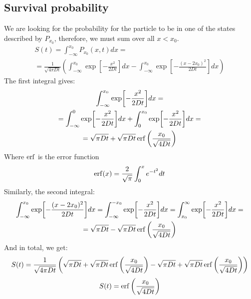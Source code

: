 \documentclass{article}
\begin{document}
\subsection{Survival probability}
We are looking for the probability for the particle to be in one of the states described by $P_{x_0}$, therefore, we must sum over all $x < x_0$.
\begin{equation}
\begin{gathered}
    S(t) = \int_{-\infty}^{x_0} P_{x_0}(x, t) dx = \\ =
    \frac{1}{\sqrt{4\pi Dt}}\left(
        \int_{-\infty}^{x_0} 
        \exp[-\frac{x^2}{2Dt}] dx - \int_{-\infty}^{x_0}\exp[-\frac{(x - 2x_0)^2}{2Dt}] dx
    \right)
\end{gathered}
\end{equation}
The first integral gives:
\begin{equation}
\begin{gathered}
    \int_{-\infty}^{x_0} \exp[-\frac{x^2}{2Dt}] dx = \\ =
    \int_{-\infty}^{0} \exp[-\frac{x^2}{2Dt}] dx +
    \int_{0}^{x_0} \exp[-\frac{x^2}{2Dt}] dx = \\ =
    \sqrt{\pi Dt} + \sqrt{\pi Dt}\erf\left(\frac{x_0}{\sqrt{4Dt}}\right)
\end{gathered}
\end{equation}
Where $\erf$ is the error function
\begin{equation}
    \erf(x) = \frac{2}{\sqrt{\pi}}\int_0^x e^{-t^2}dt
\end{equation}
Similarly, the second integral:
\begin{equation}
\begin{gathered}
    \int_{-\infty}^{x_0}\exp[-\frac{(x - 2x_0)^2}{2Dt}] dx =
    \int_{-\infty}^{-x_0}\exp[-\frac{x^2}{2Dt}] dx =
    \int_{x_0}^{\infty}\exp[-\frac{x^2}{2Dt}] dx = \\ = \sqrt{\pi Dt} - \sqrt{\pi Dt}\erf\left(\frac{x_0}{\sqrt{4Dt}}\right)
\end{gathered}
\end{equation}
And in total, we get:
\begin{equation}
    S(t) = \frac{1}{\sqrt{4\pi Dt}}\left(
        \sqrt{\pi Dt} + \sqrt{\pi Dt}\erf\left(\frac{x_0}{\sqrt{4Dt}}\right) - 
        \sqrt{\pi Dt} + \sqrt{\pi Dt}\erf\left(\frac{x_0}{\sqrt{4Dt}}\right)
    \right)
\end{equation}
\begin{equation}
    S(t) = \erf\left(\frac{x_0}{\sqrt{4Dt}}\right)
\end{equation}
\end{document}
